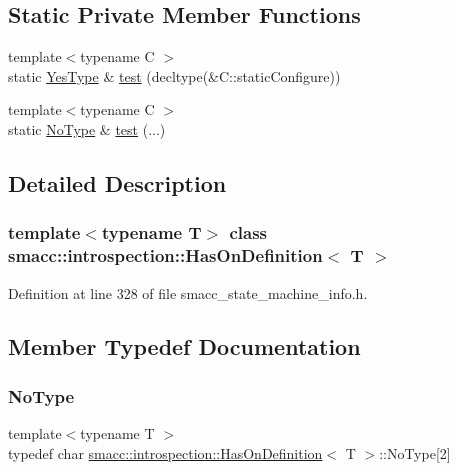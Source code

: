\subsection*{Static Private Member Functions}
\begin{DoxyCompactItemize}
\item 
{\footnotesize template$<$typename C $>$ }\\static \hyperlink{classsmacc_1_1introspection_1_1HasOnDefinition_ad18cda8f47c5a0e9660b7c7ca54d98c7}{Yes\+Type} \& \hyperlink{classsmacc_1_1introspection_1_1HasOnDefinition_a9271922a017eed3dc8d9ef931239ca3d}{test} (decltype(\&C\+::static\+Configure))
\item 
{\footnotesize template$<$typename C $>$ }\\static \hyperlink{classsmacc_1_1introspection_1_1HasOnDefinition_ab6416d52a925d6a0ce9204897191692e}{No\+Type} \& \hyperlink{classsmacc_1_1introspection_1_1HasOnDefinition_a22cbbab4a5ce8f1b85cfd98a374f7f49}{test} (...)
\end{DoxyCompactItemize}


\subsection{Detailed Description}
\subsubsection*{template$<$typename T$>$\newline
class smacc\+::introspection\+::\+Has\+On\+Definition$<$ T $>$}



Definition at line 328 of file smacc\+\_\+state\+\_\+machine\+\_\+info.\+h.



\subsection{Member Typedef Documentation}
\mbox{\label{classsmacc_1_1introspection_1_1HasOnDefinition_ab6416d52a925d6a0ce9204897191692e}} 
\subsubsection{\texorpdfstring{No\+Type}{NoType}}
{\footnotesize\ttfamily template$<$typename T $>$ \\
typedef char \hyperlink{classsmacc_1_1introspection_1_1HasOnDefinition}{smacc\+::introspection\+::\+Has\+On\+Definition}$<$ T $>$\+::No\+Type\mbox{[}2\mbox{]}\hspace{0.3cm}{\ttfamily [private]}}



